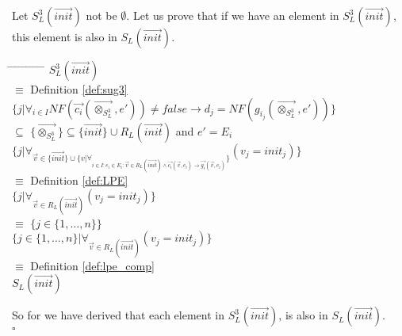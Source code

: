 \documentclass[a4paper,10pt]{article}
\newcommand{\ovr}{\overrightarrow}
\newcommand{\sq}{$\square$}
\begin{document}
\begin{defn}
Let $S_L^3(\ovr{init})$ not be $\emptyset$. Let us prove that if we have an element in $S_L^3(\ovr{init})$, this element is also in $S_L(\ovr{init})$.
\begin{tabbing}
\hspace*{5.mm} \= \hspace*{5.mm} \= \hspace*{5.mm} \= \hspace*{5.mm} \= \hspace*{5.mm} \= \hspace*{5.mm}  \= \hspace*{5.mm}  \= \hspace*{5.mm}  \= \hspace*{5.mm} \= \hspace*{5.mm} \= \hspace*{5.mm}\kill
\> \> $S_L^3(\ovr{init})$\\
\> $\equiv$ \> \> Definition \ref{def:sug3}\\
\> \> $\lbrace j \vert \forall_{i \in I} NF(\ovr{c_i}( \ovr{\otimes_{S_L^3}}, e')) \neq false \rightarrow d_j = NF(g_{i_j} (\ovr{\otimes_{S_L^3}}, e' ))  \rbrace$\\
\> $\subseteq$\> \> $ \lbrace \ovr{\otimes_{S_L^3}} \rbrace \subseteq \lbrace \ovr{init} \rbrace \cup R_L(\ovr{init})$
and $e' = E_i$ \\
\> \> $\lbrace j \vert \forall_{\ovr{v} \in \lbrace \ovr{init} \rbrace \cup \lbrace v \vert \forall_{i \in I: e_i \in E_i : \ovr{v} \in R_L(\ovr{init}) \wedge \ovr{c_i}(\ovr{v}, e_i) \rightarrow \ovr{g_i}(\ovr{v}, e_i)} \rbrace } (v_j = init_j) \rbrace$ \\
\> $\equiv$ \> \>Definition \ref{def:LPE}\\
\> \> $\lbrace j \vert \forall_{\ovr{v} \in R_L(\ovr{init})} (v_j = init_j) \rbrace$\\
\> $\equiv$ \> \>$\lbrace j \in \lbrace 1, \ldots, n \rbrace \rbrace  $\\
\> \> $\lbrace j \in \lbrace 1, \ldots, n \rbrace \vert \forall_{\ovr{v} \in R_L(\ovr{init})} (v_j = init_j) \rbrace$\\
\> $\equiv$ \> \>Definition \ref{def:lpe_comp}\\
\> \> $S_L(\ovr{init})$
\end{tabbing}
So for we have derived that each element in $S_L^3(\ovr{init})$, is also in $S_L(\ovr{init})$.
\\ \sq
\end{defn}
\end{document}
